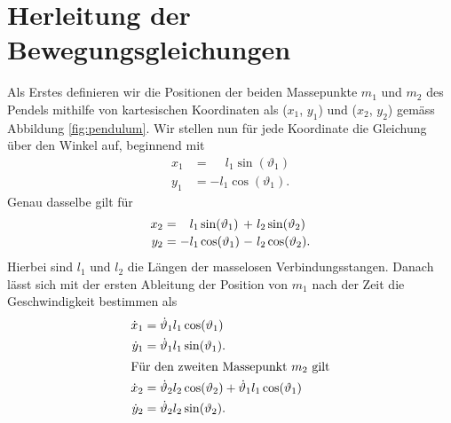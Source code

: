\section{Herleitung der Bewegungsgleichungen}
%
Als Erstes definieren wir die Positionen der beiden Massepunkte 
\(m_1\) und \(m_2\) des Pendels mithilfe von kartesischen Koordinaten 
als (\(x_1\), \(y_1\)) und (\(x_2\), \(y_2\)) gemäss Abbildung \ref{fig:pendulum}.
Wir stellen nun für jede Koordinate die Gleichung über den Winkel auf,
beginnend mit
\begin{align*}
    x_1 &= \phantom{-}l_1 \sin(\vartheta_1)\\
    y_1 &= -l_1 \cos(\vartheta_1).
\end{align*}
Genau dasselbe gilt für
\begin{equation*}
\renewcommand{\arraycolsep}{1.5pt}
\begin{array}{rcrlcrl}
    x_2 &=&  l_1&\hspace*{-1.5pt}\sin(\vartheta_1)&+&l_2&\hspace*{-1.5pt}\sin(\vartheta_2)\\[2pt]
    y_2 &=& -l_1&\hspace*{-1.5pt}\cos(\vartheta_1)&-&l_2&\hspace*{-1.5pt}\cos(\vartheta_2).  
\end{array}
\end{equation*}
Hierbei sind \(l_1\) und \(l_2\) die Längen der masselosen Verbindungsstangen.
Danach lässt sich mit der ersten Ableitung der Position von
\(m_1\) nach der Zeit die Geschwindigkeit bestimmen als
\begin{align*}
    \dot{x}_1 &= \dot{\vartheta}_1 l_1 \cos(\vartheta_1)\\
    \dot{y}_1 &= \dot{\vartheta}_1 l_1 \sin(\vartheta_1).\\ 
\intertext{Für den zweiten Massepunkt \(m_2\) gilt}
    \dot{x}_2 &= \dot{\vartheta}_2 l_2 \cos(\vartheta_2)
    + \dot{\vartheta}_1 l_1 \cos(\vartheta_1)\\
    \dot{y}_2 &= \dot{\vartheta}_2 l_2 \sin(\vartheta_2).
\end{align*}

